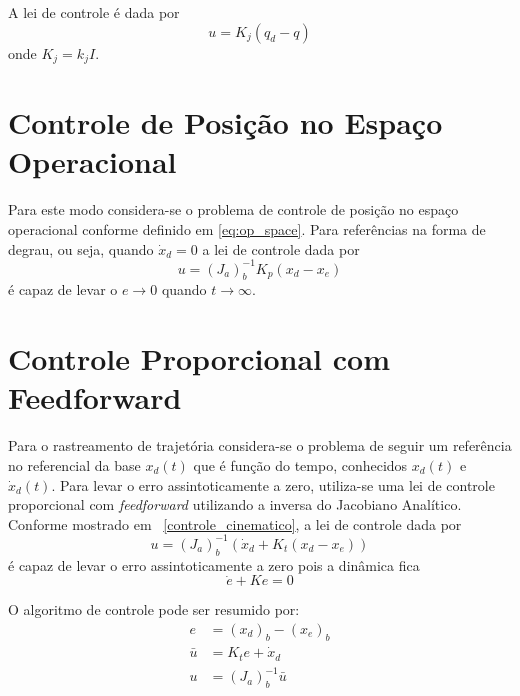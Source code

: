 A lei de controle é dada por 
\begin{equation}
{u} = {K}_j ({q}_d - {q})
\end{equation}
onde ${K_j} = k_j {I}$.

\section{Controle de Posição no Espaço Operacional} \label{sec:pos_operacional}
Para este modo considera-se o problema de controle de posição no espaço operacional conforme definido em \ref{eq:op_space}. Para referências na forma de degrau, ou seja, quando $\dot{{x}}_d = 0$ a lei de controle dada por
\begin{equation} \label{eq:lei_posicao}
{u} = ({J}_{a})_b^{-1} {K}_p ({x_d} - {x_e})
\end{equation}
é capaz de levar o ${e} \rightarrow 0$ quando $t \rightarrow \infty$.

\section{Controle Proporcional com Feedforward} \label{sec:pplusf}
Para o rastreamento de trajetória considera-se o problema de seguir um referência no referencial da base ${x}_d(t)$ que é função do tempo, conhecidos ${x}_d(t)$ e ${\dot{x}}_d(t)$. Para levar o erro assintoticamente a zero, utiliza-se uma lei de controle proporcional com \textit{feedforward} utilizando a inversa do Jacobiano Analítico. Conforme mostrado em ~\ref{controle_cinematico}, a lei de controle dada por 
\begin{equation}
{u} = ({J}_{a})_b^{-1} (\dot{{x}}_d + {K}_t ({x_d} - {x_e}))
\end{equation} 
é capaz de levar o erro assintoticamente a zero pois a dinâmica fica 
\begin{equation}
\dot{{e}} + {K} {e} = 0
\end{equation}

O algoritmo de controle pode ser resumido por:
\begin{align}
{e} &= ({x}_d)_b- ({x_e})_b  \label{eq:error_pf}\\
{\bar{u}} &= {K}_t {e} + {\dot{x}}_d \\
{u} &= ({J}_a)_b^{-1} {\bar{u}}
\end{align}


